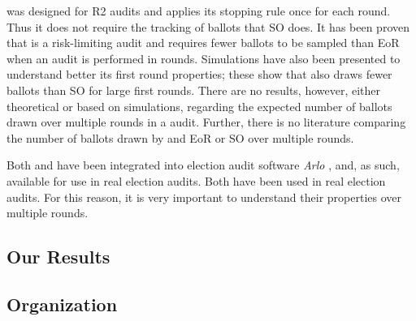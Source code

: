 \Minerva was designed for R2 audits and applies its stopping rule once for each round. Thus it does not require the tracking of ballots that SO \BRAVO does. It has been proven that \Minerva is a risk-limiting audit and requires fewer ballots to be sampled than EoR \BRAVO when an audit is performed in rounds. Simulations have also been presented to understand better its first round properties; these show that \Minerva also draws fewer ballots than SO \BRAVO for large first rounds. There are no results, however, either theoretical or based on simulations, regarding the expected number of ballots drawn over multiple rounds in a \Minerva audit. Further, there is no literature comparing the number of ballots drawn by \Minerva and EoR or SO \BRAVO over multiple rounds. 

Both \BRAVO and \Minerva have been integrated into election audit software {\em Arlo} \cite{arlo}, and, as such, available for use in real election audits. Both have been used in real election audits. For this reason, it is very important to understand their properties over multiple rounds. 

\subsection{Our Results}

\subsection{Organization}

